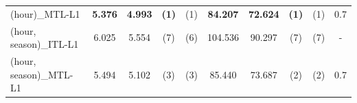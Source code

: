 \documentclass[aspectratio=43,spanish]{beamer}
\newcommand{\fmaxn}[1]{\textbf{#1}}
\newcommand{\fmod}[1]{\textsf{#1}}
\begin{document}
\begin{frame}
\begin{table}[t!]
{\begin{tabular}{lccccccccc}
                  \fmod{(hour)\_MTL-L1}   &  \fmaxn{5.376} &  \fmaxn{4.993}  & \fmaxn{(1)} & (1) &   \fmaxn{84.207} &  \fmaxn{72.624}  & \fmaxn{(1)} & (1) &  0.7 \\
                  \fmod{(hour, season)\_ITL-L1}   &  6.025 &  5.554  & (7) & (6) &  104.536 &  90.297  & (7) & (7) &  - \\
                  \fmod{(hour, season)\_MTL-L1}   &  5.494 &  5.102  & (3) & (3) &   85.440 &  73.687  & (2) & (2) &  0.7 \\
                  \bottomrule
            \end{tabular}
            }
         \end{table}

\end{frame}
\end{document}

